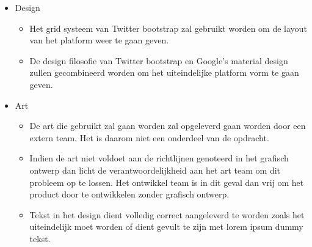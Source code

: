 \documentclass[]{report}
\begin{document}
\begin{itemize}
	\item Design
	\begin{itemize}
		\item Het grid systeem van Twitter bootstrap zal gebruikt worden om de layout van het platform weer te gaan geven.
		\item De design filosofie van Twitter bootstrap en Google's material design zullen gecombineerd worden om het uiteindelijke platform vorm te gaan geven.
		\newline
	\end{itemize}

	\item Art
	\begin{itemize}
		\item De art die gebruikt zal gaan worden zal opgeleverd gaan worden door een extern team. Het is daarom niet een onderdeel van de opdracht.
		\item Indien de art niet voldoet aan de richtlijnen genoteerd in het grafisch ontwerp dan licht de verantwoordelijkheid aan het art team om dit probleem op te lossen. Het ontwikkel team is in dit geval dan vrij om het product door te ontwikkelen zonder grafisch ontwerp.
		\item Tekst in het design dient volledig correct aangeleverd te worden zoals het uiteindelijk moet worden of dient gevult te zijn met lorem ipsum dummy tekst.
		\newline
	\end{itemize}

\end{itemize} 
\end{document}
